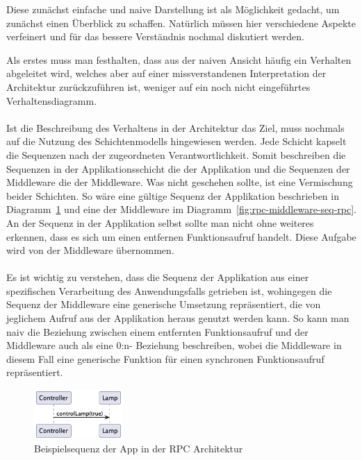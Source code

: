 Diese zunächst einfache und naive Darstellung ist als Möglichkeit gedacht, um zunächst einen Überblick zu schaffen. Natürlich müssen hier verschiedene Aspekte verfeinert und für das bessere Verständnis nochmal diskutiert werden. 

Als erstes muss man festhalten, dass aus der naiven Ansicht häufig ein Verhalten abgeleitet wird, welches aber auf einer missverstandenen Interpretation der Architektur zurückzuführen ist, weniger auf ein noch nicht eingeführtes Verhaltensdiagramm. 
\\\\
Ist die Beschreibung des Verhaltens in der Architektur das Ziel, muss nochmals auf die Nutzung des Schichtenmodells hingewiesen werden. Jede Schicht kapselt die Sequenzen nach der zugeordneten Verantwortlichkeit.
Somit beschreiben die Sequenzen in der Applikationsschicht die der Applikation und die Sequenzen der Middleware die der Middleware. Was nicht geschehen sollte, ist eine Vermischung beider Schichten. So wäre eine gültige Sequenz der Applikation beschrieben in Diagramm~\ref{fig:rpc-app-seq-rpc} und eine der Middleware im Diagramm~\ref{fig:rpc-middleware-seq-rpc}. An der Sequenz in der Applikation selbst sollte man nicht ohne weiteres erkennen, dass es sich um einen entfernen Funktionsaufruf handelt. Diese Aufgabe wird von der Middleware übernommen.
\\\\
Es ist wichtig zu verstehen, dass die Sequenz der Applikation aus einer spezifischen Verarbeitung des Anwendungsfalls getrieben ist, wohingegen die Sequenz der Middleware eine generische Umsetzung repräsentiert, die von jeglichem Aufruf aus der Applikation heraus genutzt werden kann. So kann man naiv die Beziehung zwischen einem entfernten Funktionsaufruf und der Middleware auch als eine 0:n- Beziehung beschreiben, wobei die Middleware  in diesem Fall eine generische Funktion für einen synchronen Funktionsaufruf repräsentiert. 


 \begin{figure}[!ht]
  \centering
  \includegraphics[width=0.30\textwidth]{fig/uml/rpc-app-seq.png}
  \caption{Beispielsequenz der App in der RPC Architektur}
  \label{fig:rpc-app-seq-rpc}
\end{figure}


